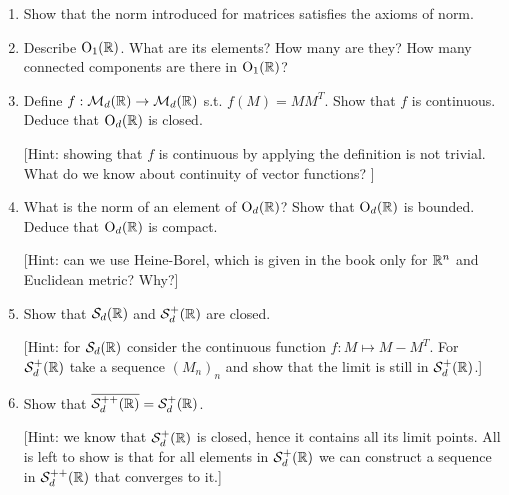 \documentclass[12pt,a4paper]{article}
\newcommand{\Tailperso}[1]{%
\vfill	
\vskip2ex\noindent
\hrule
\vskip2ex\noindent
{\small
Informations générales, séries, voir \url{https://moodle.unige.ch/course/view.php?id=5641}}
\vskip2ex\noindent
\vskip2ex
}
\begin{document}
\begin{enumerate}
\item Show that the norm introduced for matrices satisfies the axioms of norm.
\item Describe $\operatorname{O}_1(\mathbb{R})$. What are its elements? How many are they? How many connected components are there in $\operatorname{O}_1(\mathbb{R})$?
\item Define $f:\mathcal{M}_d(\mathbb{R})\to \mathcal{M}_d(\mathbb{R})$ s.t. $f(M)=MM^T$. Show that $f$ is continuous. Deduce that $\operatorname{O}_d(\mathbb{R})$ is closed.

[Hint: showing that $f$ is continuous by applying the definition is not trivial. What do we know about continuity of vector functions? ]
\item What is the norm of an element of $\operatorname{O}_d(\mathbb{R})$? Show that $\operatorname{O}_d(\mathbb{R})$ is bounded. Deduce that $\operatorname{O}_d(\mathbb{R})$ is compact.

[Hint: can we use Heine-Borel, which is given in the book only for $\mathbb{R}^n$ and Euclidean metric? Why?]
\item Show that $\mathcal{S}_d(\mathbb{R})$ and $\mathcal{S}_d^+(\mathbb{R})$ are closed. 

[Hint: for $\mathcal{S}_d(\mathbb{R})$ consider the continuous function $f\colon M\mapsto M-M^T$. For $\mathcal{S}_d^+(\mathbb{R})$ take a sequence $(M_n)_n$ and show that the limit is still in $\mathcal{S}_d^+(\mathbb{R})$.]
\item Show that $\overline{\mathcal{S}_d^{++}(\mathbb{R})}=\mathcal{S}_d^+(\mathbb{R})$.

[Hint: we know that $\mathcal{S}_d^+(\mathbb{R})$ is closed, hence it contains all its limit points. All is left to show is that for all elements in $\mathcal{S}_d^+(\mathbb{R})$ we can construct a sequence in $\mathcal{S}_d^{++}(\mathbb{R})$ that converges to it.]
\end{enumerate}




\solution{

}






 
\end{document}

